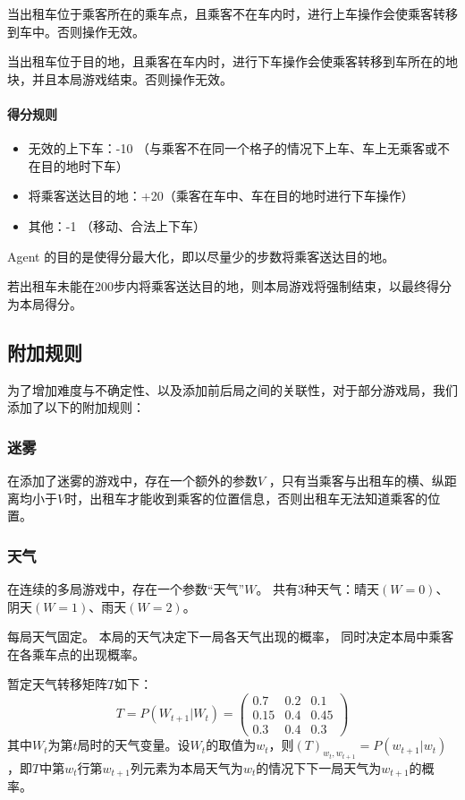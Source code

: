 \documentclass{article}
\begin{document}
\begin{CJK}{UTF8}{gbsn}
当出租车位于乘客所在的乘车点，且乘客不在车内时，进行上车操作会使乘客转移到车中。否则操作无效。 

​当出租车位于目的地，且乘客在车内时，进行下车操作会使乘客转移到车所在的地块，并且本局游戏结束。否则操作无效。 

\paragraph{\textbf{得分规则}}
\begin{itemize}
\item 无效的上下车：-10 （与乘客不在同一个格子的情况下上车、车上无乘客或不在目的地时下车） 

\item 将乘客送达目的地：+20（乘客在车中、车在目的地时进行下车操作） 

\item 其他：-1 （移动、合法上下车） 
\end{itemize}
Agent 的目的是使得分最大化，即以尽量少的步数将乘客送达目的地。 

若出租车未能在200步内将乘客送达目的地，则本局游戏将强制结束，以最终得分为本局得分。

\subsection{附加规则}
为了增加难度与不确定性、以及添加前后局之间的关联性，对于部分游戏局，我们添加了以下的附加规则：

\subsubsection{迷雾}
在添加了迷雾的游戏中，存在一个额外的参数$V$ ，只有当乘客与出租车的横、纵距离均小于$V$时，出租车才能收到乘客的位置信息，否则出租车无法知道乘客的位置。 

\subsubsection{天气} 
在连续的多局游戏中，存在一个参数“天气”$W$。
共有3种天气：晴天$(W=0)$、阴天$(W=1)$、雨天$(W=2)$。

每局天气固定。
本局的天气决定下一局各天气出现的概率，
同时决定本局中乘客在各乘车点的出现概率。

暂定天气转移矩阵$T$如下：
$$T=P(W_{t+1}|W_t)=\begin{pmatrix}
  0.7 & 0.2 & 0.1 \\
  0.15 & 0.4 & 0.45 \\
  0.3 & 0.4 & 0.3
\end{pmatrix}$$
其中$W_t$为第$t$局时的天气变量。设$W_t$的取值为$w_t$，则$(T)_{w_t,w_{t+1}}=P(w_{t+1}|w_t)$，即$T$中第$w_t$行第$w_{t+1}$列元素为本局天气为$w_t$的情况下下一局天气为$w_{t+1}$的概率。


\end{CJK}
\end{document}
